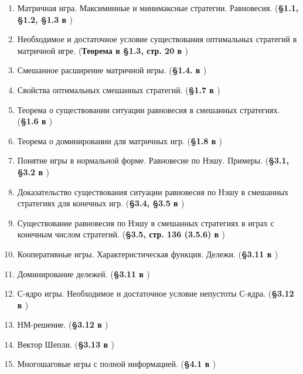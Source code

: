 \documentclass[a4paper,14pt]{extarticle}
\begin{document}


\newpage
\tableofcontents


\begin{enumerate}
    \item Матричная игра. Максиминные и минимаксные стратегии. Равновесия.
        (\textbf{\S 1.1, \S 1.2, \S 1.3 в \cite{gametheory-2012}})
    \item Необходимое и достаточное условие существования оптимальных стратегий в матричной игре.
        (\textbf{Теорема в \S 1.3, стр. 20 в \cite{gametheory-2012}})
    \item Смешанное расширение матричной игры.
        (\textbf{\S 1.4. в \cite{gametheory-2012}})
    \item Свойства оптимальных смешанных стратегий.
        (\textbf{\S 1.7 в \cite{gametheory-2012}})
    \item Теорема о существовании ситуации равновесия в смешанных стратегиях.
        (\textbf{\S 1.6 в \cite{gametheory-2012}})
    \item Теорема о доминировании для матричных игр.
        (\textbf{\S 1.8 в \cite{gametheory-2012}})
    \item Понятие игры в нормальной форме. Равновесие по Нэшу. Примеры.
        (\textbf{\S 3.1, \S 3.2 в \cite{gametheory-2012}})
    \item Доказательство существования ситуации равновесия по Нэшу в смешанных стратегиях для конечных игр.
        (\textbf{\S 3.4, \S 3.5 в \cite{gametheory-2012}})
    \item Существование равновесия по Нэшу в смешанных стратегиях в играх с конечным числом стратегий.
        (\textbf{\S 3.5, стр. 136 (3.5.6) в \cite{gametheory-2012}})
    \item Кооперативные игры. Характеристическая функция. Дележи.
        (\textbf{\S 3.11 в \cite{gametheory-2012}})
    \item Доминирование дележей.
        (\textbf{\S 3.11 в \cite{gametheory-2012}})
    \item С-ядро игры. Необходимое и достаточное условие непустоты С-ядра.
        (\textbf{\S 3.12 в \cite{gametheory-2012}})
    \item НМ-решение.
        (\textbf{\S 3.12 в \cite{gametheory-2012}})
    \item Вектор Шепли.
        (\textbf{\S 3.13 в \cite{gametheory-2012}})
    \item Многошаговые игры с полной информацией.
        (\textbf{\S 4.1 в \cite{gametheory-2012}})

\end{enumerate}
\end{document}
